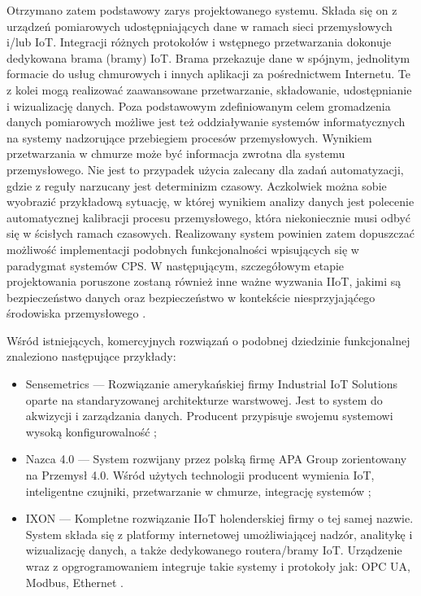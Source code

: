 \documentclass[a4paper, 12pt, twoside]{article}
\begin{document}
Otrzymano zatem podstawowy zarys projektowanego systemu. 
Składa się on z urządzeń pomiarowych udostępniających dane w ramach sieci 
przemysłowych i/lub IoT. Integracji różnych protokołów i wstępnego przetwarzania
dokonuje dedykowana brama (bramy) IoT. Brama przekazuje dane w spójnym, jednolitym
formacie do usług chmurowych i innych aplikacji za pośrednictwem Internetu.
Te z kolei mogą realizować zaawansowane przetwarzanie, składowanie, udostępnianie
i wizualizację danych. Poza podstawowym zdefiniowanym celem gromadzenia danych pomiarowych
możliwe jest też oddziaływanie systemów informatycznych na systemy nadzorujące 
przebiegiem procesów przemysłowych. Wynikiem przetwarzania w chmurze może
być informacja zwrotna dla systemu przemysłowego. Nie jest to przypadek użycia
zalecany dla zadań automatyzacji, gdzie z reguły narzucany jest determinizm czasowy. 
Aczkolwiek można sobie wyobrazić przykładową sytuację, w której wynikiem analizy danych jest 
polecenie automatycznej kalibracji procesu przemysłowego, która niekoniecznie musi
odbyć się w ścisłych ramach czasowych. Realizowany system powinien zatem dopuszczać
możliwość implementacji podobnych funkcjonalności wpisujących się w paradygmat
systemów CPS. W następującym, szczegółowym etapie projektowania poruszone zostaną również 
inne ważne wyzwania IIoT, jakimi są bezpieczeństwo danych oraz bezpieczeństwo w kontekście niesprzyjająćego
środowiska przemysłowego \cite{iiot-challenges-opportunities-directions}.

Wśród istniejących, komercyjnych rozwiązań o podobnej dziedzinie funkcjonalnej
znaleziono następujące przykłady:
\begin{itemize}
    \item Sensemetrics --- Rozwiązanie amerykańskiej firmy Industrial IoT Solutions
    oparte na standaryzowanej architekturze warstwowej. Jest to system do akwizycji
    i zarządzania danych. Producent przypisuje swojemu systemowi wysoką konfigurowalność \cite{sensmetrics};
    \item Nazca 4.0 --- System rozwijany przez polską firmę APA Group zorientowany na Przemysł 4.0.
    Wśród użytych technologii producent wymienia IoT, inteligentne czujniki, 
    przetwarzanie w chmurze, integrację systemów \cite{nazca};
    \item IXON --- Kompletne rozwiązanie IIoT holenderskiej firmy o tej samej nazwie.
    System składa się z platformy internetowej umożliwiającej nadzór, analitykę i wizualizację danych,
    a także dedykowanego routera/bramy IoT. Urządzenie wraz z opgrogramowaniem
    integruje takie systemy i protokoły jak: OPC UA, Modbus, Ethernet \cite{ixon}.
\end{itemize}
\end{document}
